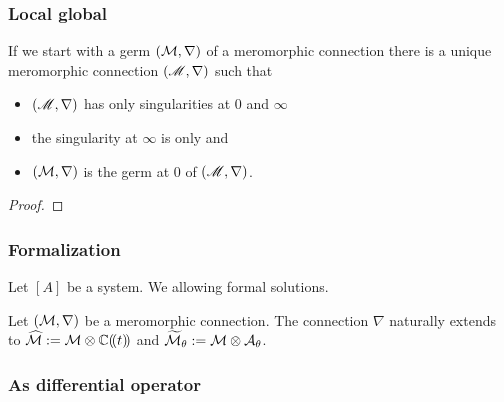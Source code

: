 \subsubsection{Local \rightarrow{} global}
\begin{comment}
  Maybe see: \cite[Thm.3.3.1]{sibuya1990Linear}: G. D. Birkhoff
\end{comment}
\begin{thm}
  \begin{comment}
    Quelle?
    \begin{itemize}
      \item \cite[Cor.II.6.4]{sabbah2007isomonodromic}
    \end{itemize}
  \end{comment}
  If we start with a germ $(\mathcal{M},\nabla)$ of a meromorphic connection there is
  a unique meromorphic connection $(\mathscr{M},\nabla)$ such that
  \begin{itemize}
    \item $(\mathscr{M},\nabla)$ has only singularities at $0$ and $\infty$
    \item the singularity at $\infty$ is only \TODO{} and
    \item $(\mathcal{M},\nabla)$ is the germ at $0$ of $(\mathscr{M},\nabla)$.
  \end{itemize}
\end{thm}
\begin{proof}
  \TODO{}
\end{proof}

\subsubsection{Formalization}
\begin{multicols}{2}
  Let $[A]$ be a system. We  allowing
  formal solutions.
  \TODO{}

\columnbreak

  Let $(\mathcal{M},\nabla)$ be a meromorphic connection. The connection $\nabla$
  naturally extends to $\widehat{\mathcal{M}}:=\mathcal{M}\otimes\mathbb{C}(\!(t)\!)$ and
  $\widetilde{\mathcal{M}}_\theta:=\mathcal{M}\otimes\mathcal{A}_\theta$.
  \TODO{}
\end{multicols}


\subsubsection{As differential operator}
\begin{comment}
  \begin{itemize}
    \item \cite[Sec.4.2]{Loday2014}
  \end{itemize}
\end{comment}

